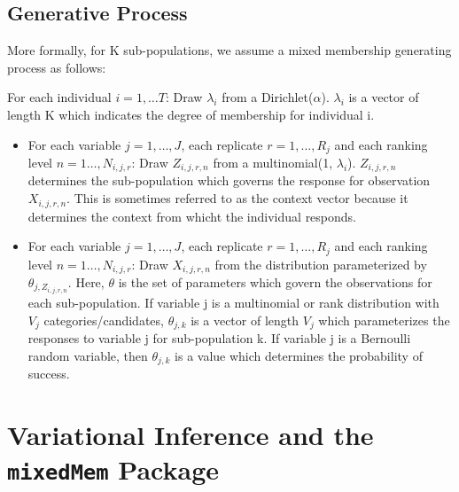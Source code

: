 \documentclass{article}\usepackage[]{graphicx}\usepackage[]{color}
\begin{document}
\subsection{Generative Process}\label{generative}
More formally, for K sub-populations, we assume a mixed membership generating process as follows:

\noindent
For each individual $i = 1,\ldots T$: Draw $\lambda_i$ from a Dirichlet($\alpha$). $\lambda_i$ is a vector of length K which indicates the degree of membership for individual i.
  \begin{itemize}
  \item For each variable $j = 1, \ldots, J$, each replicate $r = 1, \dots, R_j$ and each ranking level $n = 1\ldots, N_{i,j,r}$: Draw $Z_{i,j,r,n}$ from a multinomial(1, $\lambda_i$). $Z_{i,j,r,n}$ determines the sub-population which governs the response for observation $X_{i,j,r,n}$. This is sometimes referred to as the context vector because it determines the context from whicht the individual responds.
  \item For each variable $j = 1, \ldots, J$, each replicate $r = 1, \dots, R_j$ and each ranking level $n = 1\ldots, N_{i,j,r}$: Draw $X_{i,j,r,n}$ from the distribution parameterized by $\theta_{j,Z_{i,j,r,n}}$. Here, $\theta$ is the set of parameters which govern the observations for each sub-population. If variable j is a multinomial or rank distribution with $V_j$ categories/candidates, $\theta_{j,k}$ is a vector of length $V_j$ which parameterizes the responses to variable j for sub-population k. If variable j is a Bernoulli random variable, then $\theta_{j,k}$ is a value which determines the probability of success. 
  \end{itemize}

\section{Variational Inference and the \texttt{mixedMem} Package}\label{VA}
\end{document}
